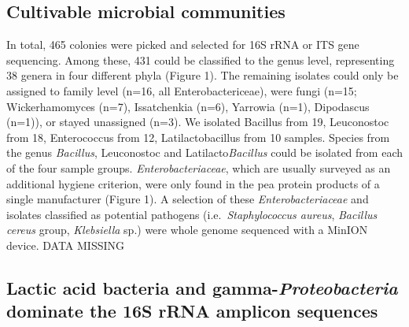 \documentclass[preprint, 3p,
authoryear]{elsarticle} %
\begin{document}
\hypertarget{cultivable-microbial-communities}{%
\subsection{Cultivable microbial
communities}\label{cultivable-microbial-communities}}

In total, 465 colonies were picked and selected for 16S rRNA or ITS gene
sequencing. Among these, 431 could be classified to the genus level,
representing 38 genera in four different phyla (Figure 1). The remaining
isolates could only be assigned to family level (n=16, all
Enterobactericeae), were fungi (n=15; Wickerhamomyces (n=7),
Issatchenkia (n=6), Yarrowia (n=1), Dipodascus (n=1)), or stayed
unassigned (n=3). We isolated Bacillus from 19, Leuconostoc from 18,
Enterococcus from 12, Latilactobacillus from 10 samples. Species from
the genus \emph{Bacillus}, Leuconostoc and Latilacto\emph{Bacillus}
could be isolated from each of the four sample groups.
\emph{Enterobacteriaceae}, which are usually surveyed as an additional
hygiene criterion, were only found in the pea protein products of a
single manufacturer (Figure 1). A selection of these
\emph{Enterobacteriaceae} and isolates classified as potential pathogens
(i.e.~\emph{Staphylococcus aureus}, \emph{Bacillus cereus} group,
\emph{Klebsiella} sp.) were whole genome sequenced with a MinION device.
DATA MISSING

\hypertarget{lactic-acid-bacteria-and-gamma-proteobacteria-dominate-the-16s-rrna-amplicon-sequences}{%
\subsection{\texorpdfstring{Lactic acid bacteria and
gamma-\emph{Proteobacteria} dominate the 16S rRNA amplicon
sequences}{Lactic acid bacteria and gamma-Proteobacteria dominate the 16S rRNA amplicon sequences}}\label{lactic-acid-bacteria-and-gamma-proteobacteria-dominate-the-16s-rrna-amplicon-sequences}}
\end{document}
